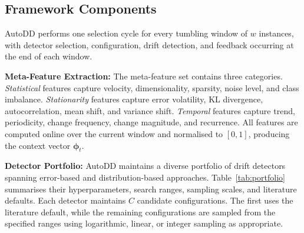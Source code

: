 \documentclass[conference]{IEEEtran}
\begin{document}
\subsection{Framework Components}

AutoDD performs one selection cycle for every tumbling window of $w$ instances, with detector selection, configuration, drift detection, and feedback occurring at the end of each window.

\textbf{Meta-Feature Extraction:}
The meta-feature set contains three categories. \emph{Statistical} features capture velocity, dimensionality, sparsity, noise level, and class imbalance. \emph{Stationarity} features capture error volatility, KL divergence, autocorrelation, mean shift, and variance shift. \emph{Temporal} features capture trend, periodicity, change frequency, change magnitude, and recurrence. All features are computed online over the current window and normalised to $[0,1]$, producing the context vector $\boldsymbol{\phi}_t$.

\textbf{Detector Portfolio:}
AutoDD maintains a diverse portfolio of drift detectors spanning error-based and distribution-based approaches. Table~\ref{tab:portfolio} summarises their hyperparameters, search ranges, sampling scales, and literature defaults. Each detector maintains $C$ candidate configurations. The first uses the literature default, while the remaining configurations are sampled from the specified ranges using logarithmic, linear, or integer sampling as appropriate.
\end{document}
